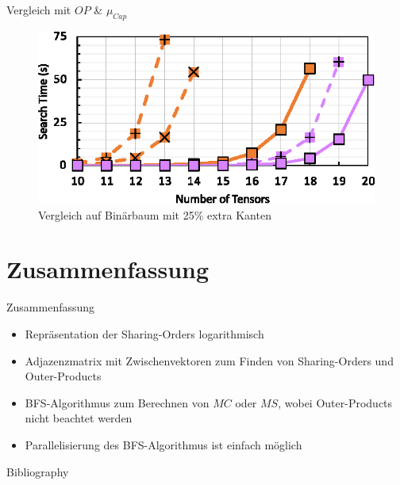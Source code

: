 \documentclass{beamer}
\begin{document}
		\begin{frame}{Vergleich mit $OP$ \& $\mu_{Cap}$}
			\begin{figure}
				\includegraphics[scale=1.3]{figure_14_b}
				\caption*{Vergleich auf Binärbaum mit 25\% extra Kanten}
			\end{figure}
		\end{frame}
		

	\section{Zusammenfassung}	

		\begin{frame}{Zusammenfassung}
			\begin{itemize}
				\item Repräsentation der Sharing-Orders logarithmisch
				\item Adjazenzmatrix mit Zwischenvektoren zum Finden von Sharing-Orders und Outer-Products
				\item BFS-Algorithmus zum Berechnen von $MC$ oder $MS$, wobei Outer-Products nicht beachtet werden
				\item Parallelisierung des BFS-Algorithmus ist einfach möglich
			\end{itemize}
		\end{frame}
	
	\begin{frame}[allowframebreaks]{Bibliography}
		
		
	\end{frame}
	
\end{document}
